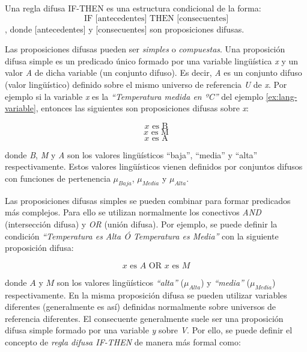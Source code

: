 \begin{definition}
Una regla difusa IF-THEN es una estructura condicional de la forma:
\begin{equation}
\text{IF [antecedentes] THEN [consecuentes]}
\end{equation},
donde [antecedentes] y [consecuentes] son proposiciones difusas.
\end{definition}

Las proposiciones difusas pueden ser \emph{simples} o \emph{compuestas}. Una proposición difusa simple es un predicado único formado por una variable lingüística \emph{x} y un valor \emph{A} de dicha variable (un conjunto difuso). Es decir, \emph{A} es un conjunto difuso (valor lingüístico) definido sobre el mismo universo de referencia \emph{U} de \emph{x}. Por ejemplo si la variable \emph{x} es la \emph{``Temperatura medida en ºC''} del ejemplo \ref{ex:lang-variable}, entonces las siguientes son proposiciones difusas sobre \emph{x}:

\begin{equation}
\text{$x$ es B}
\end{equation}
\begin{equation}
\text{$x$ es M}
\end{equation}
\begin{equation}
\text{$x$ es A}
\end{equation}

donde \emph{B}, \emph{M} y \emph{A} son los valores lingüísticos ``baja'', ``media'' y ``alta'' respectivamente. Estos valores lingüísticos vienen definidos por conjuntos difusos con funciones de pertenencia $\mu_{Baja}$, $\mu_{Media}$ y $\mu_{Alta}$.

Las proposiciones difusas simples se pueden combinar para formar predicados más complejos. Para ello se utilizan normalmente los conectivos \emph{AND} (intersección difusa) y \emph{OR} (unión difusa). Por ejemplo, se puede definir la condición \emph{``Temperatura es Alta Ó Temperatura es Media''} con la siguiente proposición difusa:

\begin{equation}
\text{$x$ es $A$ OR $x$ es $M$}
\end{equation}

donde $A$ y $M$ son los valores lingüísticos \emph{``alta''} ($\mu_{Alta}$) y \emph{``media''} ($\mu_{Media}$) respectivamente. En la misma proposición difusa se pueden utilizar variables diferentes (generalmente es así) definidas normalmente sobre universos de referencia diferentes. El consecuente generalmente suele ser una proposición difusa simple formado por una variable \emph{y} sobre \emph{V}. Por ello, se puede definir el concepto de \emph{regla difusa IF-THEN} de manera más formal como:


